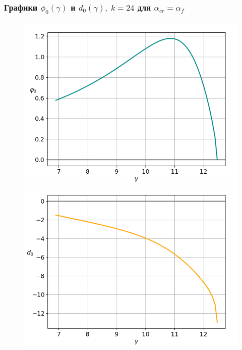 \documentclass[fullscreen=true, unicode, bookmarks=false]{beamer}
\begin{document}
\begin{frame}
\frametitle{ Графики $ \phi_0(\gamma) $ и $ d_0(\gamma), \; k = 24 $ для $ \alpha_{cr}=\alpha_f $ }

\begin{figure} 
\begin{minipage}[h]{0.49\linewidth}
\begin{center}
\includegraphics[scale=0.37]{oscillating_phi0_after_tangent_047.png}
\end{center}
\end{minipage} 
\hfill
\begin{minipage}[h]{0.49\linewidth}
\begin{center}
\includegraphics[scale=0.37]{oscillating_d0_after_tangent_047.png} 
\end{center}
\end{minipage} 
\end{figure}

\end{frame}
\end{document}
